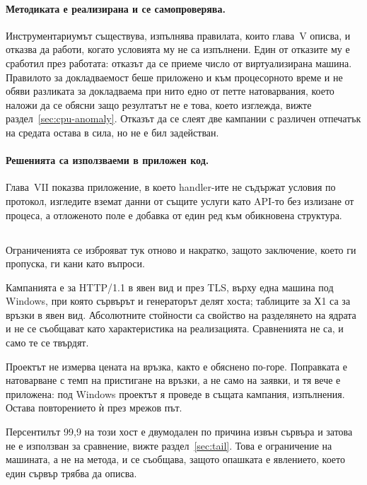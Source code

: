 \paragraph{Методиката е реализирана и се самопроверява.} Инструментариумът съществува,
изпълнява правилата, които глава~V описва, и отказва да работи, когато условията му не са
изпълнени. Един от отказите му е сработил през работата: отказът да се приеме число от
виртуализирана машина. Правилото за докладваемост беше приложено и към процесорното време и
не обяви разликата за докладваема при нито едно от петте натоварвания, което наложи да се
обясни защо резултатът не е това, което изглежда, вижте раздел~\ref{sec:cpu-anomaly}. Отказът
да се слеят две кампании с различен отпечатък на средата остава в сила, но не е бил
задействан.

\paragraph{Решенията са използваеми в приложен код.} Глава~VII показва приложение, в което
handler-ите не съдържат условия по протокол, изгледите вземат данни от същите услуги като
API-то без излизане от процеса, а отложеното поле е добавка от един ред към обикновена
структура.

\subsection*{}

Ограниченията се изброяват тук отново и накратко, защото заключение, което ги пропуска, ги
кани като въпроси.

Кампанията е за HTTP/1.1 в явен вид и през TLS, върху една машина под Windows, при която
сървърът и генераторът делят хоста; таблиците за Х1 са за връзки в явен вид. Абсолютните стойности са свойство на разделянето на ядрата и не се
съобщават като характеристика на реализацията. Сравненията не са, и само те се твърдят.

Проектът  не измерва цената на връзка, както е обяснено по-горе. Поправката е
натоварване с темп на пристигане на връзки, а не само на заявки, и тя вече е приложена: под
Windows проектът  я проведе в същата кампания, 
изпълнения. Остава повторението ѝ през мрежов път.

Персентилът 99,9 на този хост е двумодален по причина извън сървъра и затова не е използван
за сравнение, вижте раздел~\ref{sec:tail}. Това е ограничение на машината, а не на метода,
и се съобщава, защото опашката е явлението, което един сървър трябва да описва.

